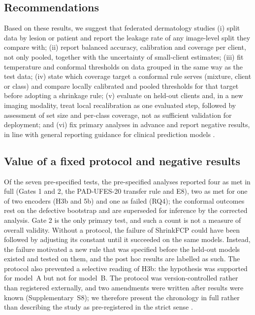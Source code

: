 \subsection{Recommendations}

Based on these results, we suggest that federated dermatology studies (i) split data by lesion or patient
and report the leakage rate of any image-level split they compare with; (ii) report balanced accuracy,
calibration and coverage per client, not only pooled, together with the uncertainty of small-client
estimates; (iii) fit temperature and conformal thresholds on data grouped in the same way as the test data;
(iv) state which coverage target a conformal rule serves (mixture, client or class) and compare locally
calibrated and pooled thresholds for that target before adopting a shrinkage rule; (v) evaluate on held-out
clients and, in a new imaging modality, treat local recalibration as one evaluated step, followed by assessment of set size and per-class coverage, not as sufficient validation for deployment; and (vi) fix primary analyses in advance and report negative results, in line with
general reporting guidance for clinical prediction models \cite{collins2024tripodai}.

\subsection{Value of a fixed protocol and negative results}

Of the seven pre-specified tests, the pre-specified analyses reported four as met in full (Gates 1 and 2, the PAD-UFES-20 transfer rule and E8), two as met for one of two encoders (H3b and 5b) and one as failed (RQ4); the conformal outcomes rest on the defective bootstrap and are superseded for inference by the corrected analysis. Gate 2 is the only primary test, and such a count is not a measure of overall validity. Without a protocol, the failure of ShrinkFCP could have been
followed by adjusting its constant until it succeeded on the same models. Instead, the failure motivated a
new rule that was specified before the held-out models existed and tested on them, and the post hoc results
are labelled as such. The protocol also prevented a selective reading of H3b: the hypothesis was supported
for model~A but not for model~B. The protocol was version-controlled rather than registered externally, and
two amendments were written after results were known (Supplementary~S8); we therefore present the chronology in
full rather than describing the study as pre-registered in the strict sense
\cite{nosek2018preregistration,kapoor2023leakage,varoquaux2022failures}.

